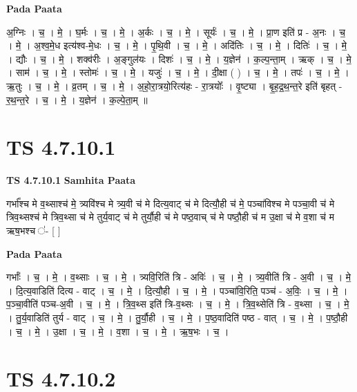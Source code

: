 \documentclass[17pt]{extarticle}
\begin{document}
\textbf{Pada Paata} \newline

अ॒ग्निः । च॒ । मे॒ । घ॒र्मः । च॒ । मे॒ । अ॒र्कः । च॒ । मे॒ । सूर्यः॑ । च॒ । मे॒ । प्रा॒ण इति॑ प्र - अ॒नः । च॒ । मे॒ । अ॒श्व॒मे॒ध इत्य॑श्व-मे॒धः । च॒ । मे॒ । पृ॒थि॒वी । च॒ । मे॒ । अदि॑तिः । च॒ । मे॒ । दितिः॑ । च॒ । मे॒ । द्यौः । च॒ । मे॒ । शक्व॑रीः । अ॒ङ्गुल॑यः । दिशः॑ । च॒ । मे॒ । य॒ज्ञेन॑ । क॒ल्प॒न्ता॒म् । ऋक् । च॒ । मे॒ । साम॑ । च॒ । मे॒ । स्तोमः॑ । च॒ । मे॒ । यजुः॑ । च॒ । मे॒ । दी॒क्षा ( ) । च॒ । मे॒ । तपः॑ । च॒ । मे॒ । ऋ॒तुः । च॒ । मे॒ । व्र॒तम् । च॒ । मे॒ । अ॒हो॒रा॒त्रयो॒रित्य॑हः - रा॒त्रयोः᳚ । वृ॒ष्ट्या । बृ॒ह॒द्र॒थ॒न्त॒रे इति॑ बृहत् - र॒थ॒न्त॒रे । च॒ । मे॒ । य॒ज्ञेन॑ । क॒ल्पे॒ता॒म् ॥  \newline




\section*{ TS 4.7.10.1 }

\textbf{TS 4.7.10.1 } \newline
\textbf{Samhita Paata} \newline

गर्भा᳚श्च मे व॒थ्साश्च॑ मे॒ त्र्यवि॑श्च मे त्र्य॒वी च॑ मे दित्य॒वाट् च॑ मे दित्यौ॒ही च॑ मे॒ पञ्चा॑विश्च मे पञ्चा॒वी च॑ मे त्रिव॒थ्सश्च॑ मे त्रिव॒थ्सा च॑ मे तुर्य॒वाट् च॑ मे तुर्यौ॒ही च॑ मे पष्ठ॒वाच् च॑ मे पष्ठौ॒ही च॑ म उ॒क्षा च॑ मे व॒शा च॑ म ऋष॒भश्च ॑- [  ] \newline

\textbf{Pada Paata} \newline

गर्भाः᳚ । च॒ । मे॒ । व॒थ्साः । च॒ । मे॒ । त्र्यवि॒रिति॑ त्रि - अविः॑ । च॒ । मे॒ । त्र्य॒वीति॑ त्रि - अ॒वी । च॒ । मे॒ । दि॒त्य॒वाडिति॑ दित्य - वाट् । च॒ । मे॒ । दि॒त्यौ॒ही । च॒ । मे॒ । पञ्चा॑वि॒रिति॒ पञ्च॑ - अ॒विः॒ । च॒ । मे॒ । प॒ञ्चा॒वीति॑ पञ्च-अ॒वी । च॒ । मे॒ । त्रि॒व॒थ्स इति॑ त्रि-व॒थ्सः । च॒ । मे॒ । त्रि॒व॒थ्सेति॑ त्रि - व॒थ्सा । च॒ । मे॒ । तु॒र्य॒वाडिति॑ तुर्य - वाट् । च॒ । मे॒ । तु॒र्यौ॒ही । च॒ । मे॒ । प॒ष्ठ॒वादिति॑ पष्ठ - वात् । च॒ । मे॒ । प॒ष्ठौ॒ही । च॒ । मे॒ । उ॒क्षा । च॒ । मे॒ । व॒शा । च॒ । मे॒ । ऋ॒ष॒भः । च॒ ।  \newline




\section*{ TS 4.7.10.2 }
\end{document}
